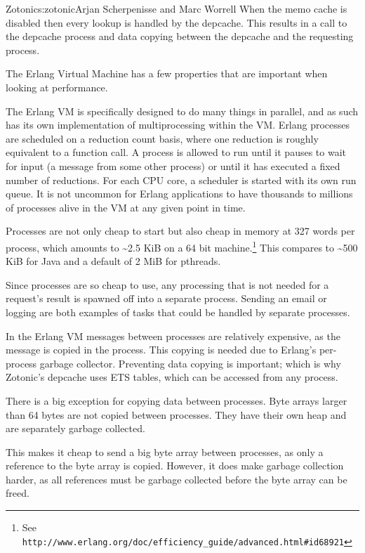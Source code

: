 \begin{aosachapter}{Zotonic}{s:zotonic}{Arjan Scherpenisse and Marc Worrell}
When the memo cache is disabled then every lookup is handled by the
depcache. This results in a call to the depcache process and data
copying between the depcache and the requesting process.


The Erlang Virtual Machine has a few properties that are important when
looking at performance.


The Erlang VM is specifically designed to do many things in parallel,
and as such has its own implementation of multiprocessing within the VM.
Erlang processes are scheduled on a reduction count basis, where one
reduction is roughly equivalent to a function call. A process is allowed
to run until it pauses to wait for input (a message from some other
process) or until it has executed a fixed number of reductions. For each
CPU core, a scheduler is started with its own run queue. It is not
uncommon for Erlang applications to have thousands to millions of
processes alive in the VM at any given point in time.

Processes are not only cheap to start but also cheap in memory at 327
words per process, which amounts to \textasciitilde{}2.5 KiB on a 64 bit
machine.\footnote{See
  \texttt{http://www.erlang.org/doc/efficiency\_guide/advanced.html\#id68921}}
This compares to \textasciitilde{}500 KiB for Java and a default of 2
MiB for pthreads.

Since processes are so cheap to use, any processing that is not needed
for a request's result is spawned off into a separate process. Sending
an email or logging are both examples of tasks that could be handled by
separate processes.


In the Erlang VM messages between processes are relatively expensive, as
the message is copied in the process. This copying is needed due to
Erlang's per-process garbage collector. Preventing data copying is
important; which is why Zotonic's depcache uses ETS tables, which can be
accessed from any process.


There is a big exception for copying data between processes. Byte arrays
larger than 64 bytes are not copied between processes. They have their
own heap and are separately garbage collected.

This makes it cheap to send a big byte array between processes, as only
a reference to the byte array is copied. However, it does make garbage
collection harder, as all references must be garbage collected before
the byte array can be freed.


\end{aosachapter}
